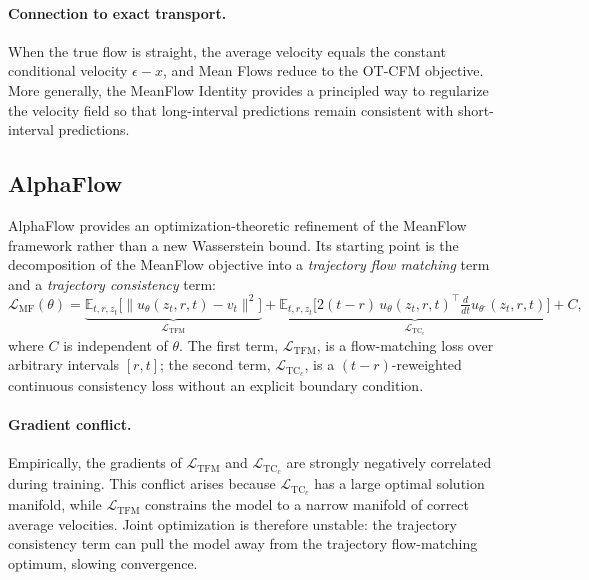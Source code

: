 \paragraph{Connection to exact transport.} When the true flow is straight, the average velocity equals the constant conditional velocity $\epsilon - x$, and Mean Flows reduce to the OT-CFM objective. More generally, the MeanFlow Identity provides a principled way to regularize the velocity field so that long-interval predictions remain consistent with short-interval predictions.


\subsection{AlphaFlow}
\label{subsec:theory-alphaflow}

AlphaFlow \citep{zhang2025alphaflow} provides an optimization-theoretic refinement of the MeanFlow framework rather than a new Wasserstein bound. Its starting point is the decomposition of the MeanFlow objective into a \emph{trajectory flow matching} term and a \emph{trajectory consistency} term:
\begin{equation}
    \mathcal{L}_{\text{MF}}(\theta) = \underbrace{\mathbb{E}_{t,r,z_t} \big[ \| u_\theta(z_t, r, t) - v_t \|^2 \big]}_{\mathcal{L}_{\text{TFM}}} + \underbrace{\mathbb{E}_{t,r,z_t} \big[ 2(t-r) \, u_\theta(z_t, r, t)^\top \tfrac{d}{dt} u_{\theta^\text{-}}(z_t, r, t) \big]}_{\mathcal{L}_{\text{TC}_c}} + C,
\end{equation}
where $C$ is independent of $\theta$. The first term, $\mathcal{L}_{\text{TFM}}$, is a flow-matching loss over arbitrary intervals $[r,t]$; the second term, $\mathcal{L}_{\text{TC}_c}$, is a $(t-r)$-reweighted continuous consistency loss without an explicit boundary condition.

\paragraph{Gradient conflict.} Empirically, the gradients of $\mathcal{L}_{\text{TFM}}$ and $\mathcal{L}_{\text{TC}_c}$ are strongly negatively correlated during training. This conflict arises because $\mathcal{L}_{\text{TC}_c}$ has a large optimal solution manifold, while $\mathcal{L}_{\text{TFM}}$ constrains the model to a narrow manifold of correct average velocities. Joint optimization is therefore unstable: the trajectory consistency term can pull the model away from the trajectory flow-matching optimum, slowing convergence.

